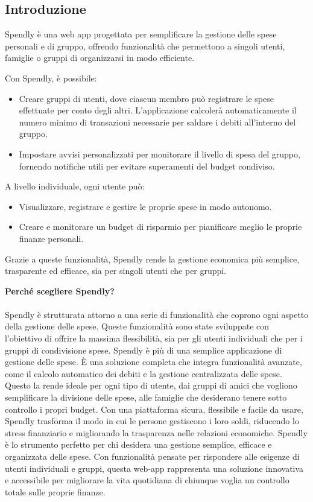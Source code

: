 \subsection{Introduzione}

Spendly è una web app progettata per semplificare la gestione delle spese personali e di gruppo, offrendo funzionalità che permettono a singoli utenti, famiglie o gruppi di organizzarsi in modo efficiente.

Con Spendly, è possibile:
\begin{itemize}
    \item Creare gruppi di utenti, dove ciascun membro può registrare le spese effettuate per conto degli altri. L'applicazione calcolerà automaticamente il numero minimo di transazioni necessarie per saldare i debiti all'interno del gruppo.
    \item Impostare avvisi personalizzati per monitorare il livello di spesa del gruppo, fornendo notifiche utili per evitare superamenti del budget condiviso.
\end{itemize}

A livello individuale, ogni utente può:
\begin{itemize}
    \item Visualizzare, registrare e gestire le proprie spese in modo autonomo.
    \item Creare e monitorare un budget di risparmio per pianificare meglio le proprie finanze personali.
\end{itemize}

Grazie a queste funzionalità, Spendly rende la gestione economica più semplice, trasparente ed efficace, sia per singoli utenti che per gruppi.

\textbf{Perché scegliere Spendly?}
\\
\\
Spendly è strutturata attorno a una serie di funzionalità che coprono ogni aspetto della gestione delle spese. Queste funzionalità sono state sviluppate con l'obiettivo di offrire la massima flessibilità, sia per gli utenti individuali che per i gruppi di condivisione spese.
Spendly è più di una semplice applicazione di gestione delle spese. È una soluzione completa che integra funzionalità avanzate, come il calcolo automatico dei debiti e la gestione centralizzata delle spese. Questo la rende ideale per ogni tipo di utente, dai gruppi di amici che vogliono semplificare la divisione delle spese, alle famiglie che desiderano tenere sotto controllo i propri budget.
Con una piattaforma sicura, flessibile e facile da usare, Spendly trasforma il modo in cui le persone gestiscono i loro soldi, riducendo lo stress finanziario e migliorando la trasparenza nelle relazioni economiche.
Spendly è lo strumento perfetto per chi desidera una gestione semplice, efficace e organizzata delle spese. Con funzionalità pensate per rispondere alle esigenze di utenti individuali e gruppi, questa web-app rappresenta una soluzione innovativa e accessibile per migliorare la vita quotidiana di chiunque voglia un controllo totale sulle proprie finanze.